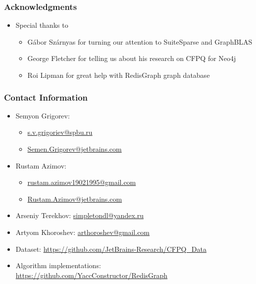 \documentclass[xcolor=table]{beamer}
\begin{document}
\begin{frame}
\frametitle{Acknowledgments}
\begin{itemize}
	\item Special thanks to
	\begin{itemize}
		\item Gábor Szárnyas for turning our attention to SuiteSparse and GraphBLAS
		\item George Fletcher for telling us about his research on CFPQ for Neo4j
		\item Roi Lipman for great help with RedisGraph graph database
	\end{itemize}
\end{itemize}
\end{frame}

\begin{frame}
\frametitle{Contact Information}
\begin{itemize}
  \item Semyon Grigorev:
    \begin{itemize}
      \item \href{mailto:s.v.grigoriev@spbu.ru}{s.v.grigoriev@spbu.ru}
      \item \href{mailto:Semen.Grigorev@jetbrains.com}{Semen.Grigorev@jetbrains.com}
    \end{itemize}
  \item Rustam Azimov:
  \begin{itemize}
  	\item \href{mailto:rustam.azimov19021995@gmail.com}{rustam.azimov19021995@gmail.com}
  	\item \href{mailto:Rustam.Azimov@jetbrains.com}{Rustam.Azimov@jetbrains.com}
  \end{itemize}
  \item Arseniy Terekhov: \href{mailto:simpletondl@yandex.ru}{simpletondl@yandex.ru}
  \item Artyom Khoroshev: \href{mailto:arthoroshev@gmail.com}{arthoroshev@gmail.com}
\vspace{0.5cm}
  \item Dataset: \href{https://github.com/JetBrains-Research/CFPQ_Data}{https://github.com/JetBrains-Research/CFPQ\_Data}
   \item Algorithm implementations: \href{https://github.com/YaccConstructor/RedisGraph}{https://github.com/YaccConstructor/RedisGraph}
\end{itemize}
\vspace{0.1cm}
\end{frame}
\end{document}
